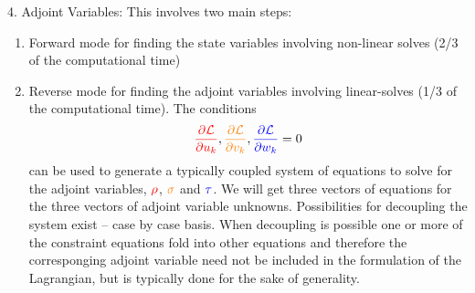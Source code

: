 \documentclass{beamer}
\newcommand{\pd}[2]{\dfrac{\partial #1}{\partial #2}}
\newenvironment{noheadline}{
    \setbeamertemplate{headline}{}
    \addtobeamertemplate{frametitle}{\vspace*{-1.5\baselineskip}}{}
}{}
\begin{document}
\begin{noheadline}
\begin{frame}[allowframebreaks]
{\begin{block}{4. Adjoint Variables:}
  This involves two main steps:
  \begin{enumerate}
  \item Forward mode for finding the state variables involving non-linear solves (2/3 of the
    computational time)
  \item Reverse mode for finding the adjoint variables involving
    linear-solves (1/3 of the computational time). The
    conditions $$\textcolor{red}{\pd{\cal{L}}{u_k}},
    \textcolor{orange}{\pd{\cal{L}}{v_k}},
    \textcolor{blue}{\pd{\cal{L}}{w_k}} = 0$$ can be used to generate
    a typically coupled system of equations to solve for the adjoint
    variables, $\textcolor{red}{\rho}$, $\textcolor{orange}{\sigma}$
    and $\textcolor{blue}{\tau}$. We will get three vectors of
    equations for the three vectors of adjoint variable
    unknowns. Possibilities for decoupling the system exist -- case by
    case basis. When decoupling is possible one or more of the
    constraint equations fold into other equations and therefore the
    corresponging adjoint variable need not be included in the
    formulation of the Lagrangian, but is typically done for the sake
    of generality.\vspace{0.25cm}


\end{enumerate}
\end{block}}
\end{frame}
\end{noheadline}
\end{document}
